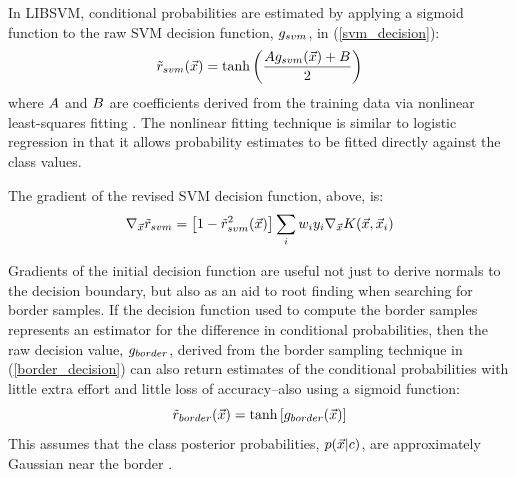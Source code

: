 In LIBSVM, conditional probabilities are estimated by applying a
sigmoid function to
the raw SVM decision function, $g_{svm}$, in (\ref{svm_decision}):
\begin{equation}
	\tilde r_{svm}(\vec {x}) = \tanh \left (\frac{A g_{svm}(\vec {x})+ B}{2} \right )
	\label{svm_prob}
\end{equation}
where $A$ and $B$ are coefficients derived from
the training data via
nonlinear least-squares fitting \citep{Platt1999, Lin_etal2007, Chang_Lin2011}.
The nonlinear fitting technique
is similar to logistic regression \citep{Michie_etal1994}
in that it allows probability estimates to be fitted directly against the class values.

The gradient of the revised SVM decision function, above, is:
\begin{equation}
	\nabla_{\vec {x}} {\tilde r_{svm}} = \left [1 - \tilde r_{svm}^2(\vec {x}) \right ] \sum_i w_i y_i \nabla_{\vec {x}} K(\vec {x}, \vec {x}_i)
\end{equation}

Gradients of the initial decision function are useful not just to derive normals to
the decision boundary, but also as an aid to root finding when searching for
border samples. If the decision function used to compute the border samples
represents an estimator for the
difference in conditional probabilities, then the raw decision value,
$g_{border}$,
derived from the border sampling technique in (\ref{border_decision})
can also return estimates of the conditional probabilities with little
extra effort and little loss of accuracy--also using a sigmoid function:
\begin{equation}
	\tilde r_{border}(\vec {x}) = \tanh \left [g_{border} (\vec {x}) \right ]
	\label{border_probability}
\end{equation}
This assumes that the class posterior probabilities,
$p(\vec {x} | c)$, are approximately Gaussian near the border
\citep{Mills2011}.

